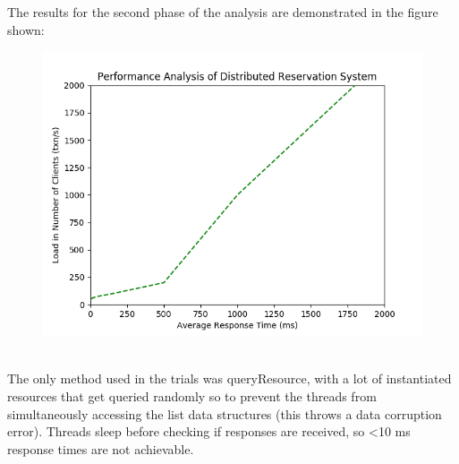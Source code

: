 \documentclass[letterpaper,12pt]{article}
\begin{document}
The results for the second phase of the analysis are demonstrated in the figure shown:\\
\begin{figure}[ht] 
	\centering \includegraphics[width=0.8\columnwidth]{performanal.png}
	
\end{figure}\\
The only method used in the trials was queryResource, with a lot of instantiated resources that get queried randomly so to prevent the threads from simultaneously accessing the list data structures (this throws a data corruption error).
Threads sleep before checking if responses are received, so <10 ms response times are
not achievable.
 
\end{document}
